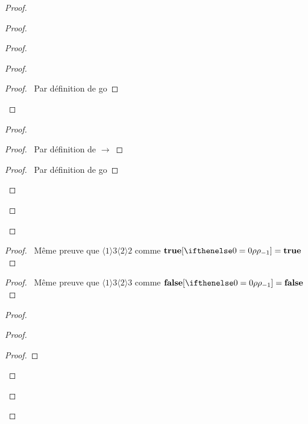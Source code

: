 \documentclass[a4paper]{article}
\begin{document}
\begin{proof}
\begin{proof}
\begin{proof}
\begin{proof}
        \begin{proof}
          \pf\ Par définition de \textsf{go}
        \end{proof}
      \end{proof}
      \begin{proof}
        \begin{proof}
          \pf\ Par définition de $\to$
        \end{proof}
        \begin{proof}
          \pf\ Par définition de \textsf{go}
        \end{proof}
      \end{proof}
    \end{proof}
  \end{proof}
  \begin{proof}
    \pf\ Même preuve que $\langle 1 \rangle 3 \langle 2 \rangle 2$ comme $\subs \true \env = \true$
  \end{proof}
  \begin{proof}
    \pf\ Même preuve que $\langle 1 \rangle 3 \langle 2 \rangle 3$ comme $\subs \false \env = \false$
  \end{proof}
  \begin{proof}
    \begin{proof}
      \begin{proof}

\end{proof}
\end{proof}
\end{proof}
\end{proof}
\end{document}
